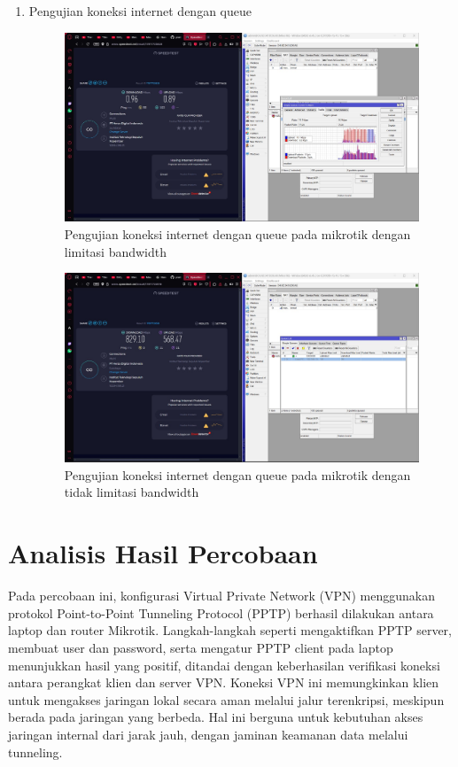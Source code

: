 \begin{enumerate}
    \item Pengujian koneksi internet dengan queue
    \begin{figure}[H]
        \centering
        \includegraphics[width=0.5\linewidth]{gambar13.jpeg}
        \caption{Pengujian koneksi internet dengan queue pada mikrotik dengan limitasi bandwidth}
        \label{fig:Pengujian-koneksi-internet-mikrotik}
    \end{figure}

    \begin{figure}[H]
        \centering
        \includegraphics[width=0.5\linewidth]{gambar14.jpeg}
        \caption{Pengujian koneksi internet dengan queue pada mikrotik dengan tidak limitasi bandwidth}
        \label{fig:Pengujian-koneksi-internet-mikrotik-2}
    \end{figure}

\end{enumerate}


\section{Analisis Hasil Percobaan}


Pada percobaan ini, konfigurasi Virtual Private Network (VPN) menggunakan protokol Point-to-Point Tunneling Protocol (PPTP) berhasil dilakukan 
antara laptop dan router Mikrotik. Langkah-langkah seperti mengaktifkan PPTP server, membuat user dan password, serta mengatur PPTP client pada 
laptop menunjukkan hasil yang positif, ditandai dengan keberhasilan verifikasi koneksi antara perangkat klien dan server VPN. Koneksi VPN ini 
memungkinkan klien untuk mengakses jaringan lokal secara aman melalui jalur terenkripsi, meskipun berada pada jaringan yang berbeda. Hal ini 
berguna untuk kebutuhan akses jaringan internal dari jarak jauh, dengan jaminan keamanan data melalui tunneling.

